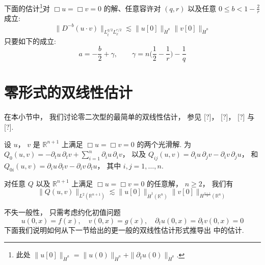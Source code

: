 \begin{theorem}\label{thm:c9-2.1}
下面的估计\footnote{此处 $\|u[0]\|_{\dot H^a} = \|u(0)\|_{\dot H^a} + \|\partial_t u(0)\|_{\dot H^a}$.}对 $\Box u = \Box v = 0$ 的解、任意容许对 $(q, r)$ 以及任意 $0 \leq b < 1 - \frac{2}{r}$ 成立:
\begin{equation}
\|D^{-b}(u\cdot v)\|_{L_t^{q/2}L_x^{r/2}} \lesssim \|u[0]\|_{\dot H^a}\|v[0]\|_{\dot H^a}\label{eq:c9-391}
\end{equation}
只要如下的成立:
\begin{equation}
a = -\frac{b}{2} + \gamma, \qquad \gamma = n\big(\frac{1}{2} - \frac{1}{r}\big) - \frac{1}{q}\label{eq:c9-392}
\end{equation}
\end{theorem}

\section{零形式的双线性估计}

在本小节中， 我们讨论零二次型的最简单的双线性估计， 参见 [?]， [?]， [?] 与 [?].

\begin{definition}\label{def:c9-3.1}
设 $u$， $v$ 是 $\mathbb{R}^{n+1}$ 上满足 $\Box u = \Box v = 0$ 的两个光滑解. 为
$Q_0(u, v) = -\partial_t u\, \partial_t v + \sum_{i=1}^{n}\partial_i u\, \partial_i v$，
以及
$Q_{ij}(u, v) = \partial_i u\, \partial_j v - \partial_i v\, \partial_j u$，
和
$Q_{0i}(u, v) = \partial_i u\, \partial_t v - \partial_i v\, \partial_t u$，
其中 $i, j = 1, \ldots, n$.
\end{definition}

\begin{theorem}\label{thm:c9-3.2}
对任意 $Q$ 以及 $\mathbb{R}^{n+1}$ 上满足 $\Box u = \Box v = 0$ 的任意解， $n \geq 2$， 我们有
\begin{equation}
\|Q(u, v)\|_{L^2(\mathbb{R}^{n+1})} \lesssim \|u[0]\|_{\dot H^1(\mathbb{R}^n)}\|v[0]\|_{H^{\frac{n+1}{2}}(\mathbb{R}^n)}\label{eq:c9-393}
\end{equation}
\end{theorem}

\begin{remark}\label{rem:c9-3.3}
不失一般性， 只需考虑约化初值问题
\begin{equation}
u(0, x) = f(x), \quad v(0, x) = g(x), \quad \partial_t u(0, x) = \partial_t v(0, x) = 0\label{eq:c9-394}
\end{equation}
下面我们说明如何从下一节给出的更一般的双线性估计形式推导出  中的估计.
\end{remark}

